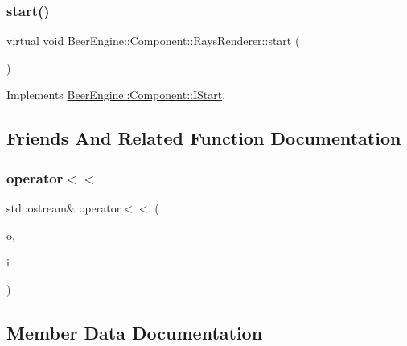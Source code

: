 \subsubsection{\texorpdfstring{start()}{start()}}
{\footnotesize\ttfamily virtual void Beer\+Engine\+::\+Component\+::\+Rays\+Renderer\+::start (\begin{DoxyParamCaption}{ }\end{DoxyParamCaption})\hspace{0.3cm}{\ttfamily [virtual]}}



Implements \mbox{\hyperlink{class_beer_engine_1_1_component_1_1_i_start_aa3e25e86e20c46cdaefc6f6d7f21e495}{Beer\+Engine\+::\+Component\+::\+I\+Start}}.



\subsection{Friends And Related Function Documentation}
\mbox{\label{class_beer_engine_1_1_component_1_1_rays_renderer_a836618cc9ceb165dceabafb52cbf742f}} 
\subsubsection{\texorpdfstring{operator$<$$<$}{operator<<}}
{\footnotesize\ttfamily std\+::ostream\& operator$<$$<$ (\begin{DoxyParamCaption}\item[{std\+::ostream \&}]{o,  }\item[{\mbox{\hyperlink{class_beer_engine_1_1_component_1_1_rays_renderer}{Rays\+Renderer}} const \&}]{i }\end{DoxyParamCaption})\hspace{0.3cm}{\ttfamily [friend]}}



\subsection{Member Data Documentation}
\mbox{\label{class_beer_engine_1_1_component_1_1_rays_renderer_a3ae64b7d39b2a52add74450a65343d31}} 
